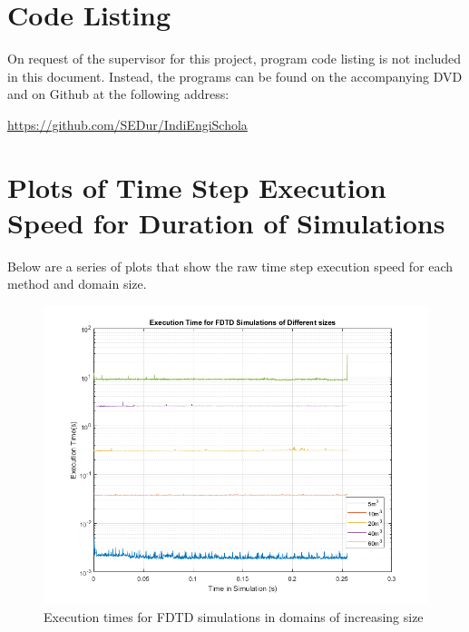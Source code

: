 %
%
%

\appendix

\chapter{Code Listing}

On request of the supervisor for this project, program code listing is not included in this document. Instead, the programs can be found on the accompanying DVD and on Github at the following address:\\
\begin{center}
\url{https://github.com/SEDur/IndiEngiSchola}
\end{center}

\chapter{Plots of Time Step Execution Speed for Duration of Simulations}

Below are a series of plots that show the raw time step execution speed for each method and domain size.

\begin{figure}[H]
\centering
  \includegraphics[width=\textwidth]{./graphics/FDTD simulation execution time.png}
  \caption{Execution times for FDTD simulations in domains of increasing size}
\end{figure}

